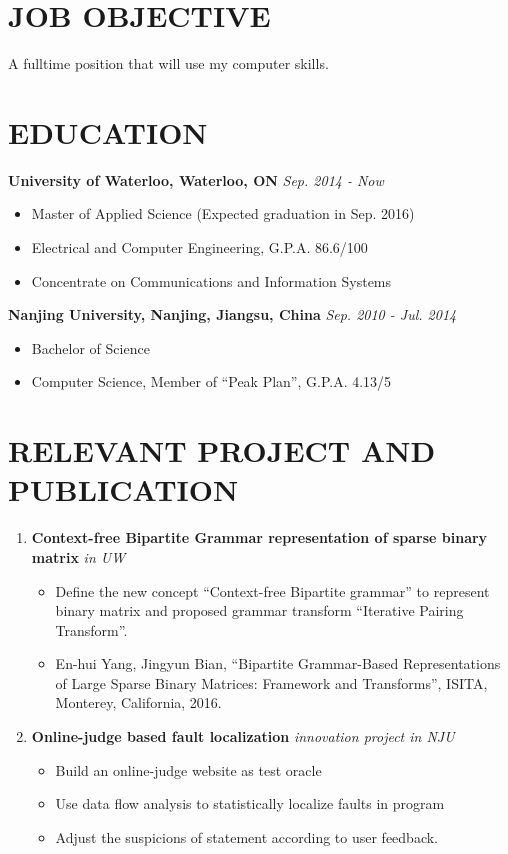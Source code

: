 \documentclass{res}
\begin{document}
\begin{resume}

\section{JOB OBJECTIVE}          
    A fulltime position that will use my computer skills.          
 
\section{EDUCATION}
  \textbf{University of Waterloo, Waterloo, ON} \hfill \emph{Sep. 2014 - Now}
  \begin{itemize}
    \item Master of Applied Science (Expected graduation in Sep. 2016) 
    \item Electrical and Computer Engineering, G.P.A. 86.6/100
    \item Concentrate on Communications and Information Systems
  \end{itemize}

  \textbf{Nanjing University, Nanjing, Jiangsu, China} \hfill \emph{Sep. 2010 - Jul. 2014}
  \begin{itemize}
    \item Bachelor of Science
    \item Computer Science, Member of ``Peak Plan'', G.P.A. 4.13/5
  \end{itemize}          

\section{RELEVANT PROJECT AND PUBLICATION}
  \begin{enumerate}
    \item \textbf{Context-free Bipartite Grammar representation of sparse binary matrix} \hfill \emph{in UW}
    \begin{itemize}
      \item Define the new concept ``Context-free Bipartite grammar'' to represent binary matrix and proposed grammar transform ``Iterative Pairing Transform''.
      \item En-hui Yang, Jingyun Bian, ``Bipartite Grammar-Based Representations of Large Sparse Binary Matrices: Framework and Transforms'', ISITA, Monterey, California, 2016. 
    \end{itemize}

    \item \textbf{Online-judge based fault localization} \hfill \emph{innovation project in NJU}
    \begin{itemize}
      \item Build an online-judge website as test oracle
      \item Use data flow analysis to statistically localize faults in program
      \item Adjust the suspicions of statement according to user feedback.
    \end{itemize}


\end{enumerate}
\end{resume}
\end{document}
